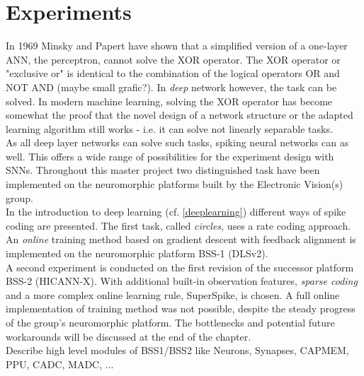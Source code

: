\chapter{Experiments}
In 1969 Minsky and Papert have shown that a simplified version of a one-layer ANN, the perceptron, cannot solve the XOR operator. The XOR operator or "exclusive or" is identical to the combination of the logical operators OR and NOT AND (maybe small grafic?). In \textit{deep} network however, the task can be solved. In modern machine learning, solving the XOR operator has become somewhat the proof that the novel design of a network structure or the adapted learning algorithm still works - i.e. it can solve not linearly separable tasks.\\

As all deep layer networks can solve such tasks, spiking neural networks can as well. This offers a wide range of possibilities for the experiment design with SNNs. Throughout this master project two distinguished task have been implemented on the neuromorphic platforms built by the Electronic Vision(s) group.\\

In the introduction to deep learning (cf. \ref{deeplearning}) different ways of spike coding are presented. The first task, called \textit{circles}, uses a rate coding approach. An \textit{online} training method based on gradient descent with feedback alignment is implemented on the neuromorphic platform BSS-1 (DLSv2).\\

A second experiment is conducted on the first revision of the successor platform BSS-2 (HICANN-X). With additional built-in observation features, \textit{sparse coding} and a more complex online learning rule, SuperSpike, is chosen. A full online implementation of training method was not possible, despite the steady progress of the group's neuromorphic platform. The bottlenecks and potential future workarounds will be discussed at the end of the chapter.\\



Describe high level modules of BSS1/BSS2 like Neurons, Synapses, CAPMEM, PPU, CADC, MADC, ...





\newpage


